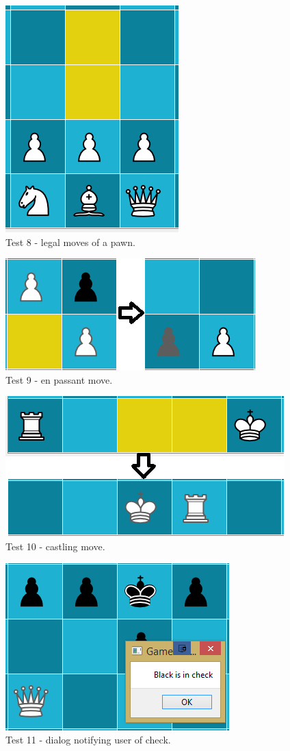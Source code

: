 \begin{figure}[H]
	\centering
	\includegraphics{images/screenshots/test-8}
	\caption{Test 8 - legal moves of a pawn.}
	\label{test-8}
\end{figure}
\begin{figure}[H]
	\centering
	\includegraphics{images/screenshots/test-9}
	\caption{Test 9 - en passant move.}
	\label{test-9}
\end{figure}
\begin{figure}[H]
	\centering
	\includegraphics{images/screenshots/test-10}
	\caption{Test 10 - castling move.}
	\label{test-10}
\end{figure}
\begin{figure}[H]
	\centering
	\includegraphics{images/screenshots/test-11}
	\caption{Test 11 - dialog notifying user of check.}
	\label{test-11}
\end{figure}
